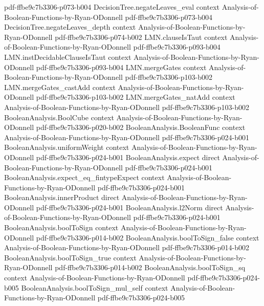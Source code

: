 \begin{lemma}
  {pdf-ffbe9c7b3306-p073-b004}
\proofstep
  {DecisionTree.negateLeaves_eval}
  {context}
  {Analysis-of-Boolean-Functions-by-Ryan-ODonnell}
  {pdf-ffbe9c7b3306-p073-b004}
\proofstep
  {DecisionTree.negateLeaves_depth}
  {context}
  {Analysis-of-Boolean-Functions-by-Ryan-ODonnell}
  {pdf-ffbe9c7b3306-p074-b002}
\proofstep
  {LMN.clauseIsTaut}
  {context}
  {Analysis-of-Boolean-Functions-by-Ryan-ODonnell}
  {pdf-ffbe9c7b3306-p093-b004}
\proofstep
  {LMN.instDecidableClauseIsTaut}
  {context}
  {Analysis-of-Boolean-Functions-by-Ryan-ODonnell}
  {pdf-ffbe9c7b3306-p093-b004}
\proofstep
  {LMN.mergeGates}
  {context}
  {Analysis-of-Boolean-Functions-by-Ryan-ODonnell}
  {pdf-ffbe9c7b3306-p103-b002}
\proofstep
  {LMN.mergeGates_castAdd}
  {context}
  {Analysis-of-Boolean-Functions-by-Ryan-ODonnell}
  {pdf-ffbe9c7b3306-p103-b002}
\proofstep
  {LMN.mergeGates_natAdd}
  {context}
  {Analysis-of-Boolean-Functions-by-Ryan-ODonnell}
  {pdf-ffbe9c7b3306-p103-b002}
\proofstep
  {BooleanAnalysis.BoolCube}
  {context}
  {Analysis-of-Boolean-Functions-by-Ryan-ODonnell}
  {pdf-ffbe9c7b3306-p020-b002}
\proofstep
  {BooleanAnalysis.BooleanFunc}
  {context}
  {Analysis-of-Boolean-Functions-by-Ryan-ODonnell}
  {pdf-ffbe9c7b3306-p024-b001}
\proofstep
  {BooleanAnalysis.uniformWeight}
  {context}
  {Analysis-of-Boolean-Functions-by-Ryan-ODonnell}
  {pdf-ffbe9c7b3306-p024-b001}
\proofstep
  {BooleanAnalysis.expect}
  {direct}
  {Analysis-of-Boolean-Functions-by-Ryan-ODonnell}
  {pdf-ffbe9c7b3306-p024-b001}
\proofstep
  {BooleanAnalysis.expect_eq_fintypeExpect}
  {context}
  {Analysis-of-Boolean-Functions-by-Ryan-ODonnell}
  {pdf-ffbe9c7b3306-p024-b001}
\proofstep
  {BooleanAnalysis.innerProduct}
  {direct}
  {Analysis-of-Boolean-Functions-by-Ryan-ODonnell}
  {pdf-ffbe9c7b3306-p024-b001}
\proofstep
  {BooleanAnalysis.l2Norm}
  {direct}
  {Analysis-of-Boolean-Functions-by-Ryan-ODonnell}
  {pdf-ffbe9c7b3306-p024-b001}
\proofstep
  {BooleanAnalysis.boolToSign}
  {context}
  {Analysis-of-Boolean-Functions-by-Ryan-ODonnell}
  {pdf-ffbe9c7b3306-p014-b002}
\proofstep
  {BooleanAnalysis.boolToSign_false}
  {context}
  {Analysis-of-Boolean-Functions-by-Ryan-ODonnell}
  {pdf-ffbe9c7b3306-p014-b002}
\proofstep
  {BooleanAnalysis.boolToSign_true}
  {context}
  {Analysis-of-Boolean-Functions-by-Ryan-ODonnell}
  {pdf-ffbe9c7b3306-p014-b002}
\proofstep
  {BooleanAnalysis.boolToSign_sq}
  {context}
  {Analysis-of-Boolean-Functions-by-Ryan-ODonnell}
  {pdf-ffbe9c7b3306-p024-b005}
\proofstep
  {BooleanAnalysis.boolToSign_mul_self}
  {context}
  {Analysis-of-Boolean-Functions-by-Ryan-ODonnell}
  {pdf-ffbe9c7b3306-p024-b005}

\end{lemma}
